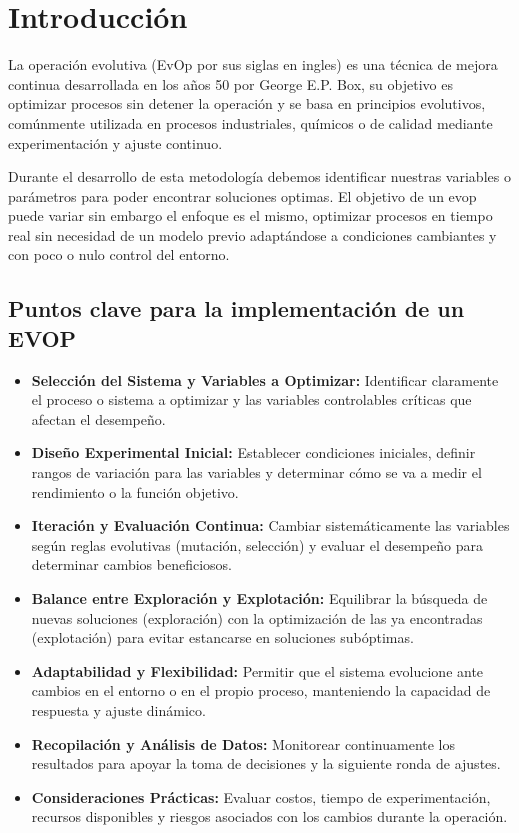 \section{Introducción}

La operación evolutiva (EvOp por sus siglas en ingles) es una técnica de mejora continua desarrollada en los años 50 por George E.P. Box, su objetivo es optimizar procesos sin detener la operación y se basa en principios evolutivos, comúnmente utilizada en procesos industriales, químicos o de calidad mediante experimentación y ajuste continuo\cite{barnett1960introduction}.

Durante el desarrollo de esta metodología debemos identificar nuestras variables o parámetros para poder encontrar soluciones optimas. El objetivo de un evop puede variar sin embargo el enfoque es el mismo, optimizar procesos en tiempo real sin necesidad de un modelo previo adaptándose a condiciones cambiantes y con poco o nulo control del entorno\cite{box1957evolutionary}.

\subsection*{Puntos clave para la implementación de un EVOP}

\begin{itemize}
    \item \textbf{Selección del Sistema y Variables a Optimizar:} Identificar claramente el proceso o sistema a optimizar y las variables controlables críticas que afectan el desempeño.
    
    \item \textbf{Diseño Experimental Inicial:} Establecer condiciones iniciales, definir rangos de variación para las variables y determinar cómo se va a medir el rendimiento o la función objetivo.
    
    \item \textbf{Iteración y Evaluación Continua:} Cambiar sistemáticamente las variables según reglas evolutivas (mutación, selección) y evaluar el desempeño para determinar cambios beneficiosos.
    
    \item \textbf{Balance entre Exploración y Explotación:} Equilibrar la búsqueda de nuevas soluciones (exploración) con la optimización de las ya encontradas (explotación) para evitar estancarse en soluciones subóptimas.
    
    \item \textbf{Adaptabilidad y Flexibilidad:} Permitir que el sistema evolucione ante cambios en el entorno o en el propio proceso, manteniendo la capacidad de respuesta y ajuste dinámico.
    
    \item \textbf{Recopilación y Análisis de Datos:} Monitorear continuamente los resultados para apoyar la toma de decisiones y la siguiente ronda de ajustes.
    
    \item \textbf{Consideraciones Prácticas:} Evaluar costos, tiempo de experimentación, recursos disponibles y riesgos asociados con los cambios durante la operación.
\end{itemize}
